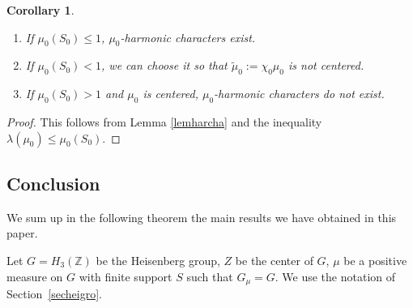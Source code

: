 \documentclass[JEP,XML,SOM,Unicode]{cedram}
\newenvironment{enumeratea}
{\bgroup\def\theenumi{\alph{enumi}}\begin{enumerate}}
{\end{enumerate}\egroup}
\newtheorem{Cor}[Thm]{Corollary}
\theoremstyle{definition}
\newcommand{\m}[1]{\mathbb{ #1}}
\let\la\lambda
\let\bq\relax
\let\eq\relax
\begin{document}
\skpt
\begin{Cor}
\label{corharcha}
\begin{enumeratea}
\item
If $\mu_0(S_0)\leq 1$, $\mu_0$-harmonic characters exist.
\item
If $\mu_0(S_0)< 1$, we can choose it so that
$\widetilde{\mu}_0:=\chi_0\mu_0$ is not centered.
\item
If $\mu_0(S_0)>1$ and $\mu_0$ is centered, $\mu_0$-harmonic characters do not exist.
\end{enumeratea}
\end{Cor}

\begin{proof}
This follows from Lemma \ref{lemharcha} and the inequality $\la(\mu_0)\leq \mu_0(S_0)$.
\end{proof}

\subsection{Conclusion}
\label{secconclu}
\bq
We sum up in the following theorem
the main results we have obtained in this paper.
\eq

Let $G=H_3(\m Z)$ be the Heisenberg group,
$Z$ be the center of $G$, $\mu$ be a positive measure on $G$ with finite support $S$
such that $G_\mu=G$. We use the notation of Section~\ref{secheigro}.
\end{document}
